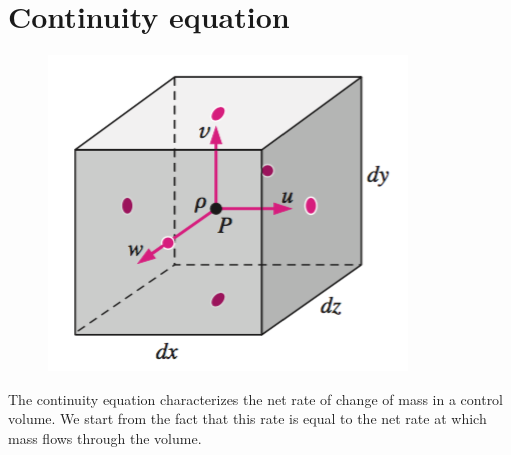 \section{Continuity equation}
	\begin{figure}
		\vspace{-5mm}
		\includegraphics[scale=0.5]{ch2/3}
		\end{figure}
			The continuity equation characterizes the net rate of change of mass in a control volume. We start from the fact that this rate is equal to the net rate at which mass flows through the volume. \\
			
